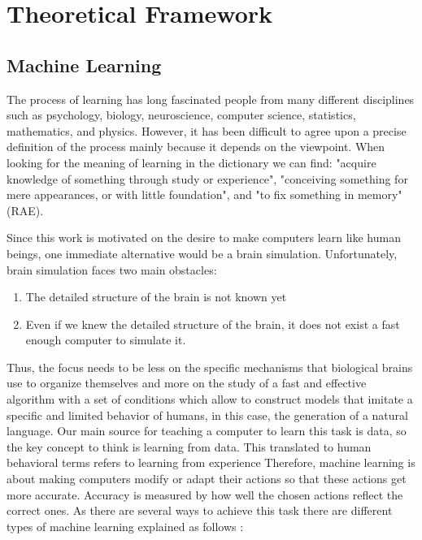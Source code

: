 \chapter{Theoretical Framework}
\label{ch:teo}



\section{Machine Learning}

The process of learning has long fascinated people from many different disciplines such as psychology, biology, neuroscience, computer science, statistics, mathematics, and physics. However, it has been difficult to agree upon a precise definition of the process mainly because it depends on the viewpoint. When looking for the meaning of learning in the dictionary we can find: "acquire knowledge of something through study or experience", "conceiving something for mere appearances, or with little foundation", and "to fix something in memory"(RAE).

Since this work is motivated on the desire to make computers learn like human beings, one immediate alternative would be a brain simulation. Unfortunately, brain simulation faces two main obstacles\cite{natarajan2014machine}:
\begin{enumerate}
\item  The detailed structure of the brain is not known yet
\item Even if we knew the detailed structure of the brain, it does not exist a fast enough computer to simulate it. 
\end{enumerate}

Thus, the focus needs to be less on the specific mechanisms that biological brains use to organize themselves and more on the study of a fast and effective algorithm with a set of conditions which allow to construct models that imitate a specific and limited behavior of humans\cite{strom2007hebbian}, in this case, the generation of a natural language. Our main source for teaching a computer to learn this task is data, so the key concept to think is learning from data. This translated to human behavioral terms refers to learning from experience
Therefore, machine learning is about making computers modify or adapt their actions so that these actions get more accurate. Accuracy is measured by how well the chosen actions reflect the correct ones. As there are several ways to achieve this task there are different types of machine learning explained as follows \cite{marsland2015machine}:

